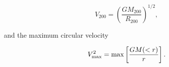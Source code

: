 \begin{equation}
V_{200} = \left(\frac{GM_{200}}{R_{200}}\right)^{1/2},
\end{equation}

and the maximum circular velocity 

\begin{equation}
V_{\rm max}^{2} = {\rm max}\left[\frac{GM(<r)}{r}\right].
\end{equation}












